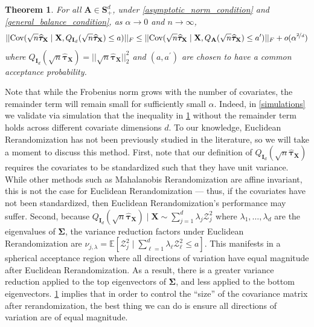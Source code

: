 \documentclass[11pt,twoside]{article}
\newtheorem{theorem}{Theorem}
\theoremstyle{definition}
\theoremstyle{remark}
\begin{document}
\begin{theorem}\label{opnorm}
    For all $\mathbf{A} \in \mathbf{S}^{d}_{+}$, under \cref{asymptotic_norm_condition} and \cref{general_balance_condition}, as $\alpha \to 0$ and $n \to \infty$,
    \begin{align*}
        ||\text{Cov}(\sqrt{n} \widehat{\bm{\tau}}_{\mathbf{X}} \mid \mathbf{X}, Q_{\mathbf{I}_d}(\sqrt{n} \widehat{\bm{\tau}}_{\mathbf{X}}) \leq a)||_{F} \leq ||\text{Cov}(\sqrt{n} \widehat{\bm{\tau}}_{\mathbf{X}} \mid \mathbf{X}, Q_{\mathbf{A}}(\sqrt{n} \widehat{\bm{\tau}}_{\mathbf{X}}) \leq a^{\prime})||_{F} + o(\alpha^{\nicefrac{2}{d}})
    \end{align*}
     where $Q_{\mathbf{I}_d}(\sqrt{n} \widehat{\bm{\tau}}_{\mathbf{X}}) = ||\sqrt{n} \widehat{\bm{\tau}}_{\mathbf{X}}||^2_2$ and $(a, a^\prime)$ are chosen to have a common acceptance probability.
\end{theorem}
Note that while the Frobenius norm grows with the number of covariates, the remainder term will remain small for sufficiently small $\alpha$. Indeed, in \cref{simulations} we validate via simulation that the inequality in \cref{opnorm} without the remainder term holds across different covariate dimensions $d$. To our knowledge, Euclidean Rerandomization has not been previously studied in the literature, so we will take a moment to discuss this method. First, note that our definition of $Q_{\mathbf{I}_d}(\sqrt{n} \widehat{\bm{\tau}}_{\mathbf{X}})$ requires the covariates to be standardized such that they have unit variance. While other methods such as Mahalanobis Rerandomization are affine invariant, this is not the case for Euclidean Rerandomization --- thus, if the covariates have not been standardized, then Euclidean Rerandomization's performance may suffer. Second, because $Q_{\mathbf{I}_d}(\sqrt{n} \widehat{\bm{\tau}}_{\mathbf{X}}) \mid \mathbf{X} \sim \sum^d_{j=1} \lambda_j \mathcal{Z}^2_j$ where $\lambda_1, \ldots, \lambda_d$ are the eigenvalues of $\mathbf{\Sigma}$, the variance reduction factors under Euclidean Rerandomization are $\nu_{j, \lambda} = \mathbb{E}[\mathcal{Z}^2_j \mid \sum^d_{\ell=1} \lambda_\ell \mathcal{Z}^2_\ell \leq a ]$. This manifests in a spherical acceptance region where all directions of variation have equal magnitude after Euclidean Rerandomization. As a result, there is a greater variance reduction applied to the top eigenvectors of $\mathbf{\Sigma}$, and less applied to the bottom eigenvectors. \cref{opnorm} implies that in order to control the ``size'' of the covariance matrix after rerandomization, the best thing we can do is ensure all directions of variation are of equal magnitude.
\end{document}
